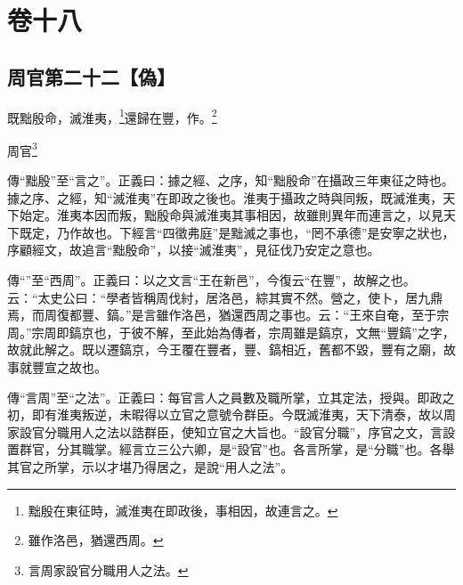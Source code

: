 

\chapter{卷十八}


\section{周官第二十二【偽】}


既黜殷命，滅淮夷，\footnote{黜殷在東征時，滅淮夷在即政後，事相因，故連言之。}還歸在豐，作。\footnote{雖作洛邑，猶還西周。}

周官\footnote{言周家設官分職用人之法。}


{\noindent\zhuan{}\fzbyks 傳“黜殷”至“言之”。正義曰：據之經、之序，知“黜殷命”在攝政三年東征之時也。據之序、之經，知“滅淮夷”在即政之後也。淮夷于攝政之時與同叛，既滅淮夷，天下始定。淮夷本因而叛，黜殷命與滅淮夷其事相因，故雖則異年而連言之，以見天下既定，乃作故也。下經言“四徵弗庭”是黜滅之事也，“罔不承德”是安寧之狀也，序顧經文，故追言“黜殷命”，以接“滅淮夷”，見征伐乃安定之意也。 \par}

{\noindent\zhuan{}\fzbyks 傳“”至“西周”。正義曰：以之文言“王在新邑”，今復云“在豐”，故解之也。云：“太史公曰：“學者皆稱周伐紂，居洛邑，綜其實不然。營之，使卜，居九鼎焉，而周復都豐、鎬。”是言雖作洛邑，猶還西周之事也。云：“王來自奄，至于宗周。”宗周即鎬京也，于彼不解，至此始為傳者，宗周雖是鎬京，文無“豐鎬”之字，故就此解之。既以遷鎬京，今王覆在豐者，豐、鎬相近，舊都不毀，豐有之廟，故事就豐宣之故也。 \par}

{\noindent\zhuan{}\fzbyks 傳“言周”至“之法”。正義曰：每官言人之員數及職所掌，立其定法，授與。即政之初，即有淮夷叛逆，未暇得以立官之意號令群臣。今既滅淮夷，天下清泰，故以周家設官分職用人之法以誥群臣，使知立官之大旨也。“設官分職”，序官之文，言設置群官，分其職掌。經言立三公六卿，是“設官”也。各言所掌，是“分職”也。各舉其官之所掌，示以才堪乃得居之，是說“用人之法”。 \par}

